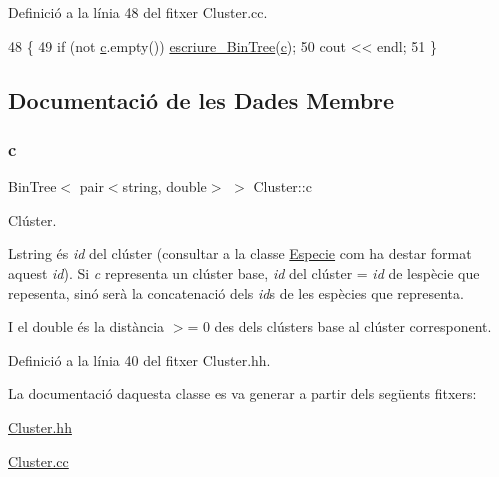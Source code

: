 Definició a la línia 48 del fitxer Cluster.\+cc.


\begin{DoxyCode}
48                              \{
49     \textcolor{keywordflow}{if} (not \hyperlink{class_cluster_a1a623435b5ec16328059c9300fa0dfaa}{c}.empty()) \hyperlink{class_cluster_ac42a9b07faa929e29d7cfa1c334544fc}{escriure\_BinTree}(\hyperlink{class_cluster_a1a623435b5ec16328059c9300fa0dfaa}{c});
50     cout << endl;
51 \}
\end{DoxyCode}


\subsection{Documentació de les Dades Membre}
\mbox{\label{class_cluster_a1a623435b5ec16328059c9300fa0dfaa}} 
\subsubsection{\texorpdfstring{c}{c}}
{\footnotesize\ttfamily Bin\+Tree$<$ pair$<$string, double$>$ $>$ Cluster\+::c\hspace{0.3cm}{\ttfamily [private]}}



Clúster. 

L\textquotesingle{}string és {\itshape id} del clúster (consultar a la classe \hyperlink{class_especie}{Especie} com ha d\textquotesingle{}estar format aquest {\itshape id}). Si {\itshape c} representa un clúster base, {\itshape id} del clúster = {\itshape id} de l\textquotesingle{}espècie que repesenta, sinó serà la concatenació dels {\itshape id}s de les espècies que representa.

I el double és la distància $>$= 0 des dels clústers base al clúster corresponent. 

Definició a la línia 40 del fitxer Cluster.\+hh.



La documentació d\textquotesingle{}aquesta classe es va generar a partir dels següents fitxers\+:\begin{DoxyCompactItemize}
\item 
\hyperlink{_cluster_8hh}{Cluster.\+hh}\item 
\hyperlink{_cluster_8cc}{Cluster.\+cc}\end{DoxyCompactItemize}

